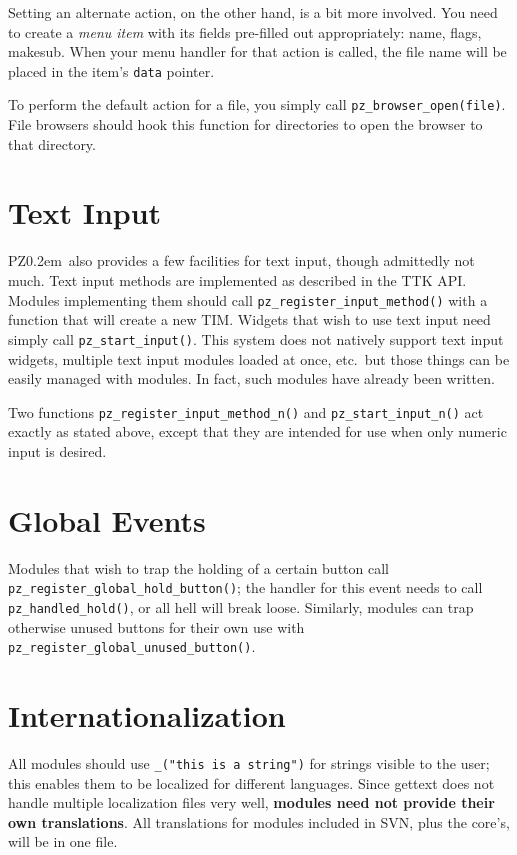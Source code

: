 \documentclass[12pt,letterpaper]{report}
\def\pz{{\footnotesize PZ}}
\def\pzt{\pz\kern0.2em{\large\oldstyle2}}
\begin{document}
Setting an alternate action, on the other hand, is a bit more involved. You need to
create a {\it menu item} with its fields pre-filled out appropriately: name, flags,
{\sf makesub}. When your menu handler for that action is called, the file name
will be placed in the item's \verb|data| pointer.

To perform the default action for a file, you simply call \verb|pz_browser_open(file)|.
File browsers should hook this function for directories to open the browser to that
directory.

\section{Text Input}
\pzt\ also provides a few facilities for text input, though admittedly not much.
Text input methods are implemented as described in the TTK API. Modules implementing them
should call \verb|pz_register_input_method()| with a function that will create a new
TIM. Widgets that wish to use text input need simply call \verb|pz_start_input()|.
This system does not natively support text input widgets, multiple text input modules
loaded at once, etc.~but those things can be easily managed with modules. In fact, such
modules have already been written.

Two functions \verb|pz_register_input_method_n()| and \verb|pz_start_input_n()| act exactly
as stated above, except that they are intended for use when only numeric input is desired.

\section{Global Events}
Modules that wish to trap the holding of a certain button call \verb|pz_register_|\hskip0pt\verb|global_hold_button()|;
the handler for this event needs to call \verb|pz_handled_|\hskip0pt\verb|hold()|, or all hell will break loose. Similarly, modules can trap
otherwise unused buttons for their own use with \verb|pz_register_global_unused_button()|.

\section{Internationalization}
All modules should use \verb|_("this is a string")| for strings visible to the user; this
enables them to be localized for different languages. Since gettext does not handle
multiple localization files very well, {\bf modules need not provide their own translations}.
All translations for modules included in SVN, plus the core's, will be in one file.
\end{document}
